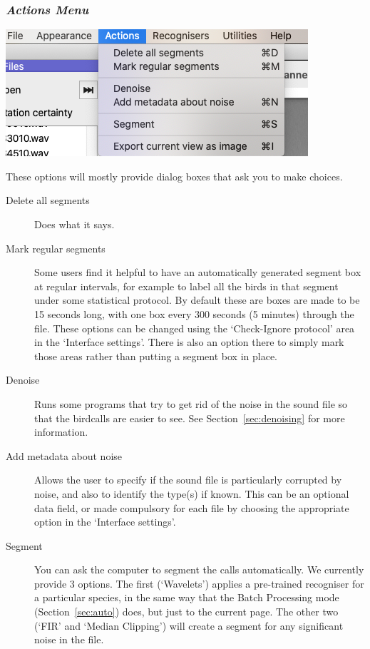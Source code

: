 \documentclass{article}
\begin{document}
\subsubsection{{\em Actions Menu}}
\label{sec:action}

\begin{center}
\includegraphics[width=.3\textwidth]{Figures/ActionsMenu}
\end{center}

These options will mostly provide dialog boxes that ask you to make choices. 

\begin{description}
\item [Delete all segments] Does what it says. 
\item [Mark regular segments] Some users find it helpful to have an automatically generated segment box at regular intervals, for example to label all the birds in that segment under some statistical protocol. By default these are boxes are made to be 15 seconds long, with one box every 300 seconds (5 minutes) through the file. These options can be changed using the `Check-Ignore protocol' area in the `Interface settings'. There is also an option there to simply mark those areas rather than putting a segment box in place.
\item [Denoise] Runs some programs that try to get rid of the noise in the sound file so that the birdcalls are easier to see. %
See Section~\ref{sec:denoising} for more information.
\item [Add metadata about noise] Allows the user to specify if the sound file is particularly corrupted by noise, and also to identify the type(s) if known. This can be an optional data field, or made compulsory for each file by choosing the appropriate option in the `Interface settings'.
\item [Segment] You can ask the computer to segment the calls automatically. We currently provide 3 options. The first (`Wavelets') applies a pre-trained recogniser for a particular species, in the same way that the Batch Processing mode (Section~\ref{sec:auto}) does, but just to the current page. The other two (`FIR' and `Median Clipping') will create a segment for any significant noise in the file. 

\end{description}
\end{document}
